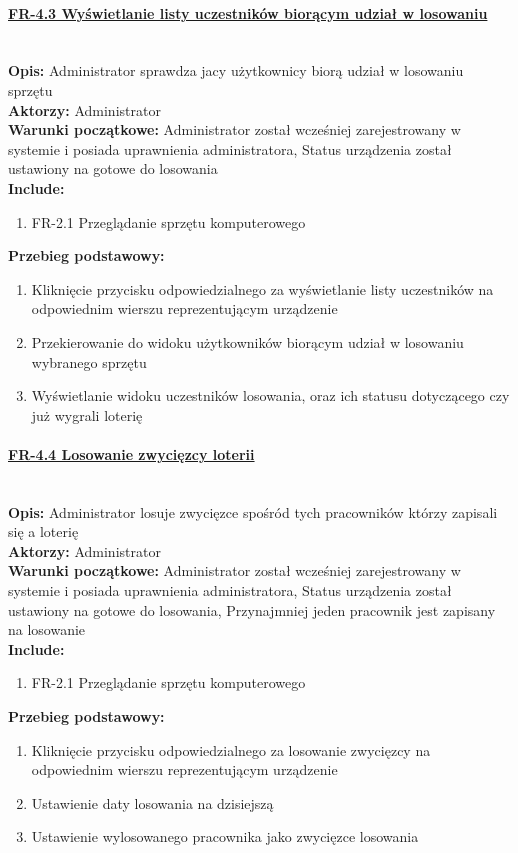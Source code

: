 \paragraph{\underline{FR-4.3 Wyświetlanie listy uczestników biorącym udział w losowaniu}}\mbox{}\\[1mm]
	\noindent\textbf{Opis:} Administrator sprawdza jacy użytkownicy biorą udział w losowaniu sprzętu\\
	\noindent\textbf{Aktorzy:} Administrator\\
	\textbf{Warunki początkowe:} Administrator został wcześniej zarejestrowany w systemie i posiada uprawnienia administratora, Status urządzenia został ustawiony na gotowe do losowania\\
	\textbf{Include:} 
	\begin{enumerate}[noparskip]
		\item FR-2.1 Przeglądanie sprzętu komputerowego
	\end{enumerate}
    \textbf{Przebieg podstawowy:}
	\begin{enumerate}[noparskip]
		\item Kliknięcie przycisku odpowiedzialnego za wyświetlanie listy uczestników na odpowiednim wierszu reprezentującym urządzenie
		\item Przekierowanie do widoku użytkowników biorącym udział w losowaniu wybranego sprzętu
		\item Wyświetlanie widoku uczestników losowania, oraz ich statusu dotyczącego czy już wygrali loterię
    \end{enumerate}

\paragraph{\underline{FR-4.4 Losowanie zwycięzcy loterii}}\mbox{}\\[1mm]
	\noindent\textbf{Opis:} Administrator losuje zwycięzce spośród tych pracowników którzy zapisali się a loterię\\
	\noindent\textbf{Aktorzy:} Administrator\\
	\textbf{Warunki początkowe:} Administrator został wcześniej zarejestrowany w systemie i posiada uprawnienia administratora, Status urządzenia został ustawiony na gotowe do losowania, Przynajmniej jeden pracownik jest zapisany na losowanie\\
	\textbf{Include:} 
	\begin{enumerate}[noparskip]
		\item FR-2.1 Przeglądanie sprzętu komputerowego
	\end{enumerate}
    \textbf{Przebieg podstawowy:}
	\begin{enumerate}[noparskip]
		\item Kliknięcie przycisku odpowiedzialnego za losowanie zwycięzcy na odpowiednim wierszu reprezentującym urządzenie
		\item Ustawienie daty losowania na dzisiejszą
		\item Ustawienie wylosowanego pracownika jako zwycięzce losowania 
    \end{enumerate}

